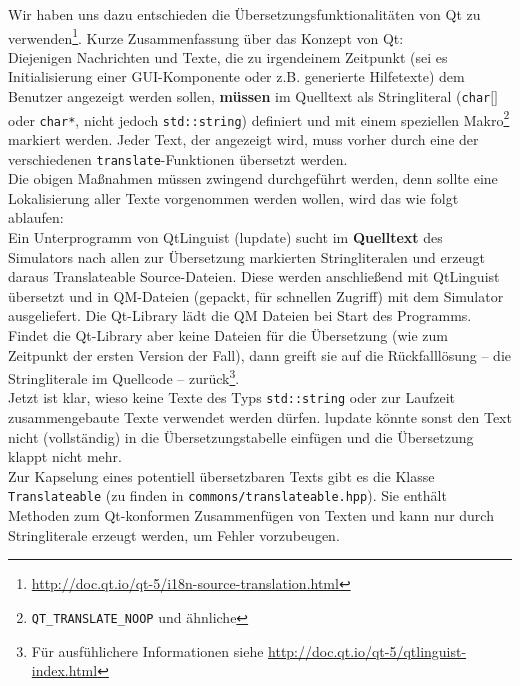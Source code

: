  Wir haben uns dazu entschieden die Übersetzungsfunktionalitäten von Qt zu
 verwenden\footnote{\url{http://doc.qt.io/qt-5/i18n-source-translation.html}}. Kurze
 Zusammenfassung über das Konzept von Qt:\\
 Diejenigen Nachrichten und Texte, die zu irgendeinem Zeitpunkt (sei es
 Initialisierung einer GUI-Komponente oder z.B. generierte Hilfetexte) dem
 Benutzer angezeigt werden sollen, \textbf{müssen} im Quelltext als
 Stringliteral (\texttt{char$\lbrack \rbrack$} oder \texttt{char*}, nicht jedoch
 \texttt{std::string}) definiert und mit einem speziellen
 Makro\footnote{\texttt{QT\_TRANSLATE\_NOOP} und ähnliche} markiert werden.
 Jeder Text, der angezeigt wird, muss vorher durch eine der verschiedenen
 \texttt{translate}-Funktionen übersetzt werden.\\

 Die obigen Maßnahmen müssen zwingend durchgeführt werden, denn sollte eine
 Lokalisierung aller Texte vorgenommen werden wollen, wird das wie folgt
 ablaufen:\\

 Ein Unterprogramm von QtLinguist (lupdate) sucht im \textbf{Quelltext} des
 Simulators nach allen zur Übersetzung markierten Stringliteralen und erzeugt daraus Translateable Source-Dateien. Diese werden anschließend mit QtLinguist übersetzt
 und in QM-Dateien (gepackt, für schnellen Zugriff) mit dem Simulator ausgeliefert.
 Die Qt-Library lädt die QM Dateien bei Start des Programms.\\

 Findet die Qt-Library aber keine Dateien für die Übersetzung (wie zum Zeitpunkt der
 ersten Version der Fall), dann greift sie auf die Rückfalllösung -- die
 Stringliterale im Quellcode -- zurück\footnote{Für ausfühlichere Informationen
 siehe \url{http://doc.qt.io/qt-5/qtlinguist-index.html}}.\\

 Jetzt ist klar, wieso keine Texte des Typs \texttt{std::string} oder zur
 Laufzeit zusammengebaute Texte verwendet werden dürfen. lupdate könnte sonst
 den Text nicht (vollständig) in die Übersetzungstabelle einfügen und die
 Übersetzung klappt nicht mehr.\\

 Zur Kapselung eines potentiell übersetzbaren Texts gibt es die Klasse
 \texttt{Translateable} (zu finden in \texttt{commons/translateable.hpp}). Sie
 enthält Methoden zum Qt-konformen Zusammenfügen von Texten und kann nur durch
 Stringliterale erzeugt werden, um Fehler vorzubeugen.
